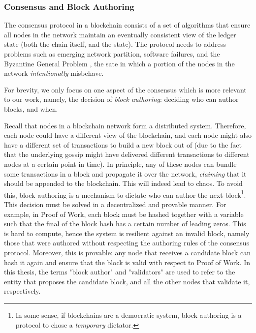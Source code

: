 \subsubsection{Consensus and Block Authoring} \label{chap_bg:subsec:consensus_authorship}


The consensus protocol in a blockchain consists of a set of algorithms that ensure all nodes in the
network maintain an eventually consistent view of the ledger state (both the chain itself, and the
state). The protocol needs to address problems such as emerging network partition, software
failures, and the Byzantine General Problem \cite{lamportByzantineGeneralsProblem1982}, the sate in
which a portion of the nodes in the network \textit{intentionally} misbehave.

For brevity, we only focus on one aspect of the consensus which is more relevant to our work,
namely, the decision of \textit{block authoring}: deciding who can author blocks, and when.

Recall that nodes in a blockchain network form a distributed system. Therefore, each node could have
a different view of the blockchain, and each node might also have a different set of transactions to
build a new block out of (due to the fact that the underlying gossip might have delivered different
transactions to different nodes at a certain point in time). In principle, any of these nodes can
bundle some transactions in a block and propagate it over the network, \textit{claiming} that it
should be appended to the blockchain. This will indeed lead to chaos. To avoid this, block authoring
is a mechanism to dictate who can author the next block\footnote{In some sense, if blockchains are a
democratic system, block authoring is a protocol to chose a \textit{temporary} dictator.}. This
decision must be solved in a decentralized and provable manner. For example, in Proof of Work, each
block must be hashed together with a variable such that the final of the block hash has a certain
number of leading zeros. This is hard to compute, hence the system is resilient against an invalid
block, namely those that were authored without respecting the authoring rules of the consensus
protocol. Moreover, this is provable: any node that receives a candidate block can hash it again and
ensure that the block is valid with respect to Proof of Work. In this thesis, the terms "block
author" and "validators" are used to refer to the entity that proposes the candidate block, and all
the other nodes that validate it, respectively.

